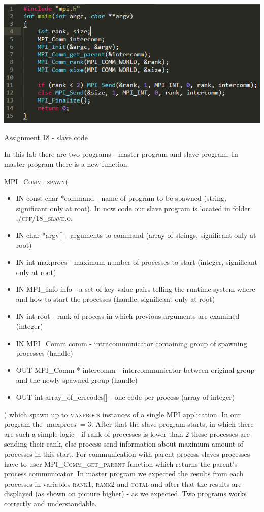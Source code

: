 \documentclass[%
12pt, %
final, %
oneside, %
onecolumn, %
centertags]{article} %
\theoremstyle{plain}
\theoremstyle{definition}
\theoremstyle{remark}
\begin{document}
\begin{center}
\includegraphics[scale=0.86]{18.slave.code.png}

Assignment 18 - slave code
\end{center}

In this lab there are two programs - master program and slave program. In master program there is a new function: 

\textsc{MPI\_Comm\_spawn}(

\begin{itemize}
	\item IN const char *command - name of program to be spawned (string, significant only at root). In now code our slave program is located in folder \textsc{./cpf/18\_slave.o}.
	\item IN char *argv[] - arguments to command (array of strings, significant only at root)
	\item IN int maxprocs - maximum number of processes to start (integer, significant only at root)
	\item IN MPI\_Info info - a set of key-value pairs telling the runtime system where and how to start the processes (handle, significant only at root)
	\item IN int root - rank of process in which previous arguments are examined (integer)
	\item IN MPI\_Comm comm - intracommunicator containing group of spawning processes (handle)
	\item OUT MPI\_Comm * intercomm - intercommunicator between original group and the newly spawned group (handle)
	\item OUT int array\_of\_errcodes[] - one code per process (array of integer)
\end{itemize}
) which spawn up to \textsc{maxprocs} instances of a single MPI application. In our program the $\operatorname{maxprocs}=3$. After that the slave program starts, in which there are such a simple logic - if rank of processes is lower than $2$ these processes are sending their rank, else process send information about maximum amount of processes in this start. For communication with parent process slaves processes have to user \textsc{MPI\_Comm\_get\_parent} function which returns the parent's process communicator. In master program we expected the results from each processes in variables \textsc{rank1}, \textsc{rank2} and \textsc{total} and after that the results are displayed (as shown on picture higher) - as we expected. Two programs works correctly and understandable.
\end{document}
